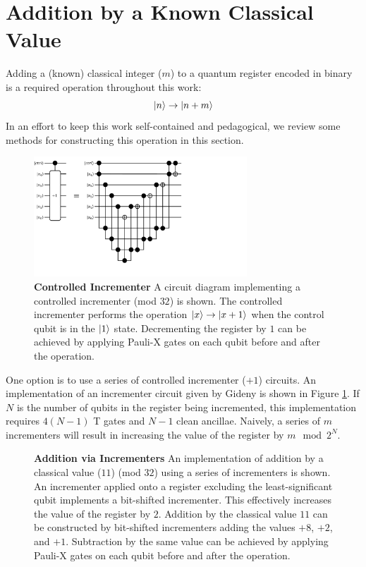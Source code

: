 \section{Addition by a Known Classical Value}
\label{sec:addition}

Adding a (known) classical integer ($m$) to a quantum register encoded in binary is a required operation throughout this work:
\begin{equation}
    \label{eq:addition-by-classical-value}
    \ket{n} \rightarrow \ket{n + m}
\end{equation}
In an effort to keep this work self-contained and pedagogical, we review some methods for constructing this operation in this section.

\begin{figure}
    \centering
    \includegraphics[width=8cm]{figures/incrementer.pdf}
    \caption{
        \textbf{Controlled Incrementer} 
        A circuit diagram implementing a controlled incrementer (mod $32$) is shown.
        The controlled incrementer performs the operation $\ket{x} \rightarrow \ket{x + 1}$ when the control qubit is in the $\ket{1}$ state.
        Decrementing the register by $1$ can be achieved by applying Pauli-X gates on each qubit before and after the operation.
    }
    \label{fig:incrementer}
\end{figure}


One option is to use a series of controlled incrementer ($+1$) circuits.
An implementation of an incrementer circuit given by Gideny \cite{Gidney_2015} is shown in Figure \ref{fig:incrementer}.
If $N$ is the number of qubits in the register being incremented, this implementation requires $4(N-1)$ T gates and $N-1$ clean ancillae.
Naively, a series of $m$ incrementers will result in increasing the value of the register by $m \mod 2^N$.

\begin{figure}
    
    \caption{
        \textbf{Addition via Incrementers} 
        An implementation of addition by a classical value ($11$) (mod $32$) using a series of incrementers is shown.
        An incrementer applied onto a register excluding the least-significant qubit implements a bit-shifted incrementer.
        This effectively increases the value of the register by $2$.
        Addition by the classical value $11$ can be constructed by bit-shifted incrementers adding the values $+8$, $+2$, and $+1$.
        Subtraction by the same value can be achieved by applying Pauli-X gates on each qubit before and after the operation.
    }
    \label{fig:addition-via-incrementers}
\end{figure}


